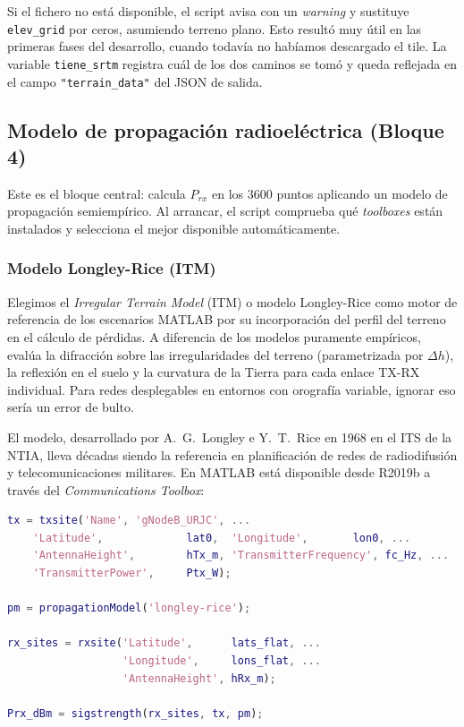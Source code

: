 Si el fichero no está disponible, el script avisa con un \textit{warning} y sustituye
\texttt{elev\_grid} por ceros, asumiendo terreno plano. Esto resultó muy útil en las
primeras fases del desarrollo, cuando todavía no habíamos descargado el tile. La variable
\texttt{tiene\_srtm} registra cuál de los dos caminos se tomó y queda reflejada en el campo
\texttt{"terrain\_data"} del JSON de salida.

\subsection{Modelo de propagación radioeléctrica (Bloque 4)}
\label{sec:matlab_propagacion}

Este es el bloque central: calcula $P_{rx}$ en los 3600 puntos aplicando un modelo de
propagación semiempírico. Al arrancar, el script comprueba qué \textit{toolboxes} están
instalados y selecciona el mejor disponible automáticamente.

\subsubsection{Modelo Longley-Rice (ITM)}
\label{sec:matlab_lr}

Elegimos el \textit{Irregular Terrain Model} (ITM) o modelo Longley-Rice
\cite{longley1968transmission} como motor de referencia de los escenarios MATLAB por su
incorporación del perfil del terreno en el cálculo de pérdidas. A diferencia
de los modelos puramente empíricos, evalúa la difracción sobre las irregularidades del
terreno (parametrizada por $\Delta h$), la reflexión en el suelo y la curvatura de la
Tierra para cada enlace TX-RX individual. Para redes desplegables en entornos con orografía
variable, ignorar eso sería un error de bulto.

El modelo, desarrollado por A.~G.~Longley e Y.~T.~Rice en 1968 en el ITS de la NTIA, lleva
décadas siendo la referencia en planificación de redes de radiodifusión y telecomunicaciones
militares. En MATLAB está disponible desde R2019b a través del \textit{Communications Toolbox}:

\begin{lstlisting}[language=MATLAB, caption={Cálculo con Longley-Rice ITM (Bloque 4).}, label={cod:lr}]
tx = txsite('Name', 'gNodeB_URJC', ...
    'Latitude',             lat0,  'Longitude',       lon0, ...
    'AntennaHeight',        hTx_m, 'TransmitterFrequency', fc_Hz, ...
    'TransmitterPower',     Ptx_W);

pm = propagationModel('longley-rice');

rx_sites = rxsite('Latitude',      lats_flat, ...
                  'Longitude',     lons_flat, ...
                  'AntennaHeight', hRx_m);

Prx_dBm = sigstrength(rx_sites, tx, pm);
\end{lstlisting}

